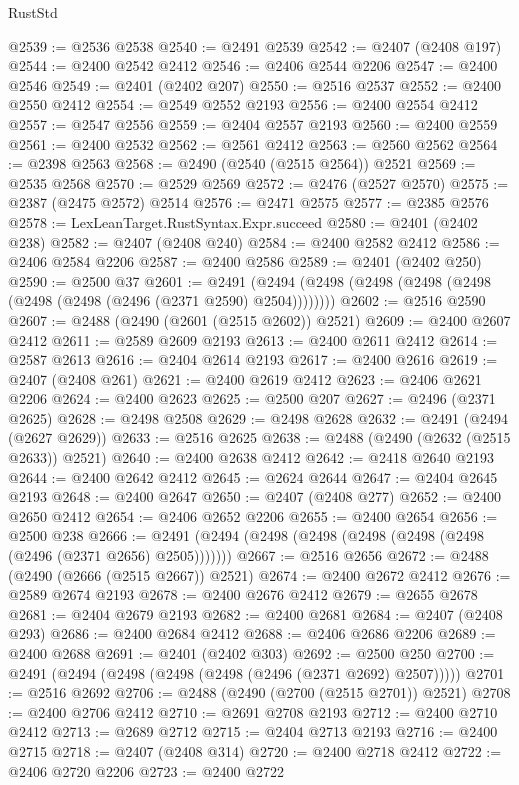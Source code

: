 \begin{lexlean}{RustStd}
\begin{coremodule}
@2539 := @2536 @2538
@2540 := @2491 @2539
@2542 := @2407 (@2408 @197)
@2544 := @2400 @2542 @2412
@2546 := @2406 @2544 @2206
@2547 := @2400 @2546
@2549 := @2401 (@2402 @207)
@2550 := @2516 @2537
@2552 := @2400 @2550 @2412
@2554 := @2549 @2552 @2193
@2556 := @2400 @2554 @2412
@2557 := @2547 @2556
@2559 := @2404 @2557 @2193
@2560 := @2400 @2559
@2561 := @2400 @2532
@2562 := @2561 @2412
@2563 := @2560 @2562
@2564 := @2398 @2563
@2568 := @2490 (@2540 (@2515 @2564)) @2521
@2569 := @2535 @2568
@2570 := @2529 @2569
@2572 := @2476 (@2527 @2570)
@2575 := @2387 (@2475 @2572) @2514
@2576 := @2471 @2575
@2577 := @2385 @2576
@2578 := LexLeanTarget.RustSyntax.Expr.succeed
@2580 := @2401 (@2402 @238)
@2582 := @2407 (@2408 @240)
@2584 := @2400 @2582 @2412
@2586 := @2406 @2584 @2206
@2587 := @2400 @2586
@2589 := @2401 (@2402 @250)
@2590 := @2500 @37
@2601 := @2491 (@2494 (@2498 (@2498 (@2498 (@2498 (@2498 (@2498 (@2496 (@2371 @2590) @2504))))))))
@2602 := @2516 @2590
@2607 := @2488 (@2490 (@2601 (@2515 @2602)) @2521)
@2609 := @2400 @2607 @2412
@2611 := @2589 @2609 @2193
@2613 := @2400 @2611 @2412
@2614 := @2587 @2613
@2616 := @2404 @2614 @2193
@2617 := @2400 @2616
@2619 := @2407 (@2408 @261)
@2621 := @2400 @2619 @2412
@2623 := @2406 @2621 @2206
@2624 := @2400 @2623
@2625 := @2500 @207
@2627 := @2496 (@2371 @2625)
@2628 := @2498 @2508
@2629 := @2498 @2628
@2632 := @2491 (@2494 (@2627 @2629))
@2633 := @2516 @2625
@2638 := @2488 (@2490 (@2632 (@2515 @2633)) @2521)
@2640 := @2400 @2638 @2412
@2642 := @2418 @2640 @2193
@2644 := @2400 @2642 @2412
@2645 := @2624 @2644
@2647 := @2404 @2645 @2193
@2648 := @2400 @2647
@2650 := @2407 (@2408 @277)
@2652 := @2400 @2650 @2412
@2654 := @2406 @2652 @2206
@2655 := @2400 @2654
@2656 := @2500 @238
@2666 := @2491 (@2494 (@2498 (@2498 (@2498 (@2498 (@2498 (@2496 (@2371 @2656) @2505)))))))
@2667 := @2516 @2656
@2672 := @2488 (@2490 (@2666 (@2515 @2667)) @2521)
@2674 := @2400 @2672 @2412
@2676 := @2589 @2674 @2193
@2678 := @2400 @2676 @2412
@2679 := @2655 @2678
@2681 := @2404 @2679 @2193
@2682 := @2400 @2681
@2684 := @2407 (@2408 @293)
@2686 := @2400 @2684 @2412
@2688 := @2406 @2686 @2206
@2689 := @2400 @2688
@2691 := @2401 (@2402 @303)
@2692 := @2500 @250
@2700 := @2491 (@2494 (@2498 (@2498 (@2498 (@2496 (@2371 @2692) @2507)))))
@2701 := @2516 @2692
@2706 := @2488 (@2490 (@2700 (@2515 @2701)) @2521)
@2708 := @2400 @2706 @2412
@2710 := @2691 @2708 @2193
@2712 := @2400 @2710 @2412
@2713 := @2689 @2712
@2715 := @2404 @2713 @2193
@2716 := @2400 @2715
@2718 := @2407 (@2408 @314)
@2720 := @2400 @2718 @2412
@2722 := @2406 @2720 @2206
@2723 := @2400 @2722

\end{coremodule}
\end{lexlean}
